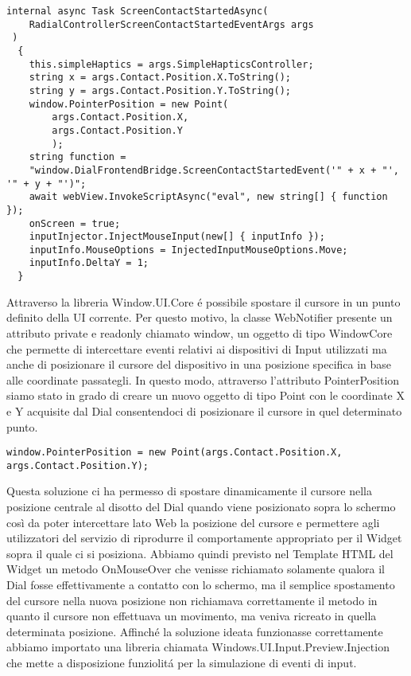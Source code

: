 \vspace{1.0cm}
\begin{lstlisting}[caption={Metodo ScreenContactStartedAsync},style=javaScriptCode]
 internal async Task ScreenContactStartedAsync(
 	RadialControllerScreenContactStartedEventArgs args
 )
  {
    this.simpleHaptics = args.SimpleHapticsController;
    string x = args.Contact.Position.X.ToString();
    string y = args.Contact.Position.Y.ToString();
    window.PointerPosition = new Point(
    	args.Contact.Position.X, 
    	args.Contact.Position.Y
    	);
    string function = 
    "window.DialFrontendBridge.ScreenContactStartedEvent('" + x + "', '" + y + "')";
    await webView.InvokeScriptAsync("eval", new string[] { function });
    onScreen = true;
    inputInjector.InjectMouseInput(new[] { inputInfo });
    inputInfo.MouseOptions = InjectedInputMouseOptions.Move;
    inputInfo.DeltaY = 1;
  }
\end{lstlisting} 
\vspace{1.0cm}


Attraverso la libreria Window.UI.Core é possibile spostare il cursore in un punto definito della UI corrente. Per questo motivo, la classe WebNotifier presente un attributo private e readonly chiamato window, un oggetto di tipo WindowCore che permette di intercettare eventi relativi ai dispositivi di Input utilizzati ma anche di posizionare il cursore del dispositivo in una posizione specifica in base alle coordinate passategli. In questo modo, attraverso l’attributo PointerPosition siamo stato in grado di creare un nuovo oggetto di tipo Point con le coordinate X e Y acquisite dal Dial consentendoci di posizionare il cursore in quel determinato punto.
\vspace{1.0cm}
\begin{lstlisting}[caption={Spostamento cursore},style=javaScriptCode]
  window.PointerPosition = new Point(args.Contact.Position.X, args.Contact.Position.Y);
\end{lstlisting} 
\vspace{1.0cm}
Questa soluzione ci ha permesso di spostare dinamicamente il cursore nella posizione centrale al disotto del Dial quando viene posizionato sopra lo schermo così da poter intercettare lato Web la posizione del cursore e permettere agli utilizzatori del servizio di riprodurre il comportamente appropriato per il Widget sopra il quale ci si posiziona.
Abbiamo quindi previsto nel Template HTML del Widget un metodo OnMouseOver che venisse richiamato solamente qualora il Dial fosse effettivamente a contatto con lo schermo, ma il semplice spostamento del cursore nella nuova posizione non richiamava correttamente il metodo in quanto il cursore non effettuava un movimento, ma veniva ricreato in quella determinata posizione.
Affinché la soluzione ideata funzionasse correttamente abbiamo importato una libreria chiamata Windows.UI.Input.Preview.Injection che mette a disposizione funziolitá per la simulazione di eventi di input.

